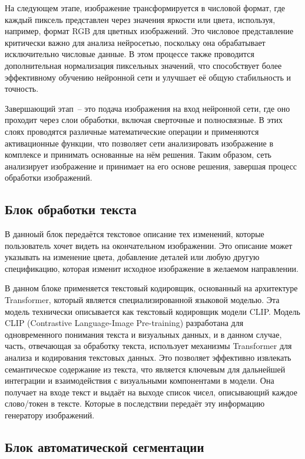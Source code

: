 На следующем этапе, изображение трансформируется в числовой формат, где каждый пиксель представлен через значения яркости или цвета, используя, например, формат RGB для цветных изображений. Это числовое представление критически важно для анализа нейросетью, поскольку она обрабатывает исключительно числовые данные. В этом процессе также проводится дополнительная нормализация пиксельных значений, что способствует более эффективному обучению нейронной сети и улучшает её общую стабильность и точность.

Завершающий этап~-- это подача изображения на вход нейронной сети, где оно проходит через слои обработки, включая сверточные и полносвязные. В этих слоях проводятся различные математические операции и применяются активационные функции, что позволяет сети анализировать изображение в комплексе и принимать основанные на нём решения. Таким образом, сеть анализирует изображение и принимает на его основе решения, завершая процесс обработки изображений.

\subsection{Блок обработки текста}

В данноый блок передаётся текстовое описание тех изменений, которые пользователь хочет видеть на окончательном изображении. Это описание может указывать на изменение цвета, добавление деталей или любую другую спецификацию, которая изменит исходное изображение в желаемом направлении.

В данном блоке применяется текстовый кодировщик, основанный на архитектуре Transformer, который является специализированной языковой моделью. Эта модель технически описывается как текстовый кодировщик модели CLIP. Модель CLIP (Contrastive Language-Image Pre-training) разработана для одновременного понимания текста и визуальных данных, и в данном случае, часть, отвечающая за обработку текста, использует механизмы Transformer для анализа и кодирования текстовых данных. Это позволяет эффективно извлекать семантическое содержание из текста, что является ключевым для дальнейшей интеграции и взаимодействия с визуальными компонентами в модели. Она получает на входе текст и выдаёт на выходе список чисел, описывающий каждое слово/токен в тексте. Которые в последствии передаёт эту информацию генератору изображений.

\subsection{Блок автоматической сегментации}

